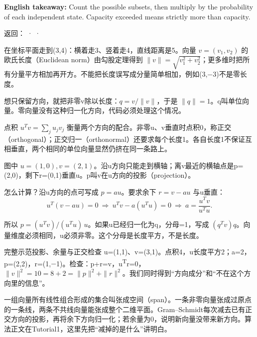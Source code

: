 \textbf{English takeaway:} Count the possible subsets, then multiply by the probability of each independent state. Capacity exceeded means strictly more than capacity.


返回： ·  · 








在坐标平面走到(3,4)：横着走3、竖着走4，直线距离是5。向量 \(v=(v_1,v_2)\) 的欧氏长度（Euclidean norm）由勾股定理得到 \(\|v\|=\sqrt{v_1^2+v_2^2}\)；更多维时把所有分量平方相加再开方。不能把长度误写成分量简单相加，例如(3,\ensuremath{-}3)不是零长度。


想只保留方向，就把非零v除以长度：\(q=v/\|v\|\)，于是 \(\|q\|=1\)。q叫单位向量。零向量没有这种归一化方向，代码必须处理这个情况。


点积 \(u^Tv=\sum_j u_jv_j\) 衡量两个方向的配合。非零u、v垂直时点积0，称正交（orthogonal）；正交归一（orthonormal）还要求每个长度1。各自长度1不保证互相垂直，两个相同的单位向量显然仍挤在同一条路上。




图中 \(u=(1,0),v=(2,1)\)。沿u方向只能走到横轴；离v最近的横轴点是p=(2,0)，剩下r=(0,1)垂直u。p叫v在u方向的投影（projection）。


怎么计算？沿u方向的点可写成 \(p=au\)。要求余下 \(r=v-au\) 与u垂直：
\[
u^T(v-au)=0\ \Rightarrow\ u^Tv-a(u^Tu)=0\ \Rightarrow\ a=\frac{u^Tv}{u^Tu}.\tag{M.35}
\]


所以 \(p=(u^Tv)/(u^Tu)\,u\)。如果u已经归一化为q，分母=1，写成 \((q^Tv)q\)。向量维度必须相同，u必须非零。这个分母是长度平方，不是长度。


\begin{StudyBlock}{完整示范}{投影、余量与正交检查}
u=(1,1)、v=(3,1)。点积4，u长度平方2；a=2，p=(2,2)，r=(1,\ensuremath{-}1)。检查：p+r=v，u\textsuperscript{T}r=0，\(\|v\|^2=10=8+2=\|p\|^2+\|r\|^2\)。我们同时得到“方向成分”和“不在这个方向里的信息”。
\end{StudyBlock}


一组向量所有线性组合形成的集合叫张成空间（span）。一条非零向量张成过原点的一条线，两条不共线向量能张成整个二维平面。Gram–Schmidt每次减去已有正交方向的投影，再将余下方向归一化；若余量为0，说明新向量没带来新方向。算法正文在Tutorial1，这里先把“减掉的是什么”讲明白。



